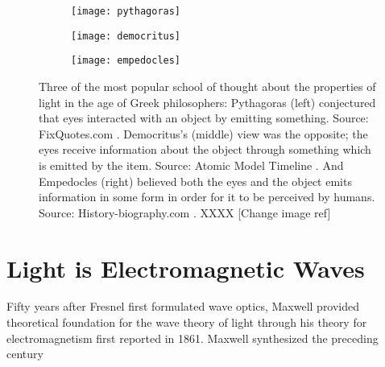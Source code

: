 \begin{figure}
\begin{subfigure}{.3\textwidth}
  \centering
  \texttt{[image: pythagoras]}
  \label{fig:pythagoras}
\end{subfigure}%
\begin{subfigure}{.3\textwidth}
  \centering
  \texttt{[image: democritus]}
  \label{fig:democritus}
\end{subfigure}
\begin{subfigure}{.3\textwidth}
  \centering
  \texttt{[image: empedocles]}
  \label{fig:empedocles}
\end{subfigure}%
\caption{Three of the most popular school of thought about the properties of light in the age of Greek philosophers: Pythagoras (left) conjectured that eyes interacted with an object by emitting something. Source: FixQuotes.com \cite{pythagoras_pic}. Democritus's (middle) view was the opposite; the eyes receive information about the object through something which is emitted by the item. Source: Atomic Model Timeline \cite{democritus_pic}. And Empedocles (right) believed both the eyes and the object emits information in some form in order for it to be perceived by humans. Source: History-biography.com \cite{empedocles_pic}. XXXX [Change image ref]}
\label{fig:early_hypothesis}
\end{figure}

\section{Light is Electromagnetic Waves}
Fifty years after Fresnel first formulated wave optics, Maxwell provided theoretical foundation for the wave theory of light through his theory for electromagnetism first reported in 1861. Maxwell synthesized the preceding century

